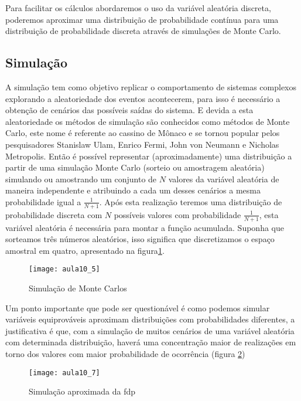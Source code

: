  Para facilitar os cálculos abordaremos o uso da variável aleatória discreta, poderemos aproximar uma distribuição de probabilidade contínua para uma distribuição de probabilidade discreta através de simulações de Monte Carlo.
 
\subsection{Simulação}

 A simulação tem como objetivo replicar o comportamento de sistemas complexos explorando a aleatoriedade dos eventos acontecerem, para isso é necessário a obtenção de cenários das possíveis saídas do sistema. E devida a esta aleatoriedade os métodos de simulação são conhecidos como métodos de Monte Carlo, este nome é referente ao cassino de Mônaco e se tornou popular pelos pesquisadores Stanislaw Ulam, Enrico Fermi, John von Neumann e Nicholas Metropolis.
 Então é possível representar (aproximadamente) uma distribuição a partir de uma simulação Monte Carlo (sorteio ou amostragem aleatória) simulando ou amostrando um conjunto de $N$ valores da variável aleatória de maneira independente e atribuindo a cada um desses cenários a mesma probabilidade igual a $\frac{1}{N+1}$. Após esta realização teremos uma distribuição de probabilidade discreta com $N$ possíveis valores com probabilidade  $\frac{1}{N+1}$, esta variável aleatória é necessária para montar a função acumulada. Suponha que sorteamos três números aleatórios, isso significa que discretizamos o espaço amostral em quatro, apresentado na figura\ref{fig:aula10_5}.
 

\begin{figure}[H]
\begin{centering}
\texttt{[image: aula10\_5]}\protect\caption{\label{fig:aula10_5} Simulação de Monte Carlos}
\end{centering}
\end{figure}
 Um ponto importante que pode ser questionável é como podemos simular variáveis equiprováveis aproximam distribuições com probabilidades diferentes, a justificativa é que, com a simulação de muitos cenários de uma variável aleatória com determinada distribuição, haverá uma concentração maior de realizações em torno dos valores com maior probabilidade de ocorrência (figura \ref{fig:aula10_7})

\begin{figure}[H]
\begin{centering}
\texttt{[image: aula10\_7]}\protect\caption{\label{fig:aula10_7} Simulação aproximada da fdp}
\end{centering}
\end{figure}

